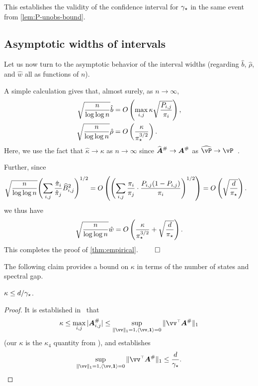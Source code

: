 This establishes the validity of the confidence interval for $\gamma_{\star}$ in
the same event from \cref{lem:P-unobs-bound}.

\subsection{Asymptotic widths of intervals}
\label{sec:asymptotic}

Let us now turn to the asymptotic behavior of the interval widths
(regarding $\hat{b}$, $\hat\rho$, and $\hat{w}$ all as
functions of $n$).

A simple calculation gives that, almost surely, as $n\to \infty$,
\begin{align*}
  \sqrt{\frac{n}{\log\log n}}
  \hat{b}
  & =
  O\left(
    \max_{i,j} \kappa \sqrt{\frac{P_{i,j}}{\pi_i}}
  \right)
  ,
  \\
  \sqrt{\frac{n}{\log\log n}}
  \hat\rho
  & =
  O\left(
    \frac{\kappa}{\pi_{\star}^{3/2}}
  \right)
  .
\end{align*}
Here, we use the fact that $\hat\kappa \to \kappa$ as $n\to\infty$
since $\giAh \to \giA$ as $\wh\vP \to
\vP$~\citep{li2001improvement,benitez2012continuity}.

Further, since
\begin{align*}
  \sqrt{\frac{n}{\log\log n}}
  \Biggl(
    \sum_{i,j} \frac{\hat{\pi}_i}{\hat{\pi}_j} \widehat{B}_{i,j}^2
  \Biggr)^{1/2}
  & =
  O\left(
    \Biggl(
      \sum_{i,j} \frac{{\pi}_i}{{\pi}_j}
      \cdot \frac{P_{i,j}(1-P_{i,j})}{\pi_i}
    \Biggr)^{1/2}
  \right)
  =
  O\left( \sqrt{ \frac{d}{\pi_{\star}}} \right)
  .
\end{align*}
we thus have
\begin{align*}
  \sqrt{\frac{n}{\log\log n}}
  \hat{w}
  =
  O\left( 
    \frac{\kappa}{\pi_{\star}^{3/2}} + 
    \sqrt{\frac{d}{\pi_{\star}}}
  \right)
  .
\end{align*}
This completes the proof of \cref{thm:empirical}.
\hfill $\qed$

The following claim provides a bound on $\kappa$ in terms of the
number of states and spectral gap.
\begin{claim}
  \label{claim:kappa-bound}
  $\kappa \leq d/\gamma_{\star}$.
\end{claim}
\begin{proof}
  It is established in~\citep{cho2001comparison} that
  \[
    \kappa
    \leq \max_{i,j} |\giA_{i,j}|
    \leq
    \sup_{\norm{\vv}_1 = 1 , \dotp{\vv,\v1} = 0} \norm{\vv^\t \giA}_1
  \]
  (our $\kappa$ is the $\kappa_4$ quantity from
  \citep{cho2001comparison}), and \citep{seneta1993sensitivity}
  establishes
  \[
    \sup_{\norm{\vv}_1 = 1 , \dotp{\vv,\v1} = 0} \norm{\vv^\t \giA}_1
    \leq
    \frac{d}{\gap}
    .
    \qedhere
  \]
\end{proof}

